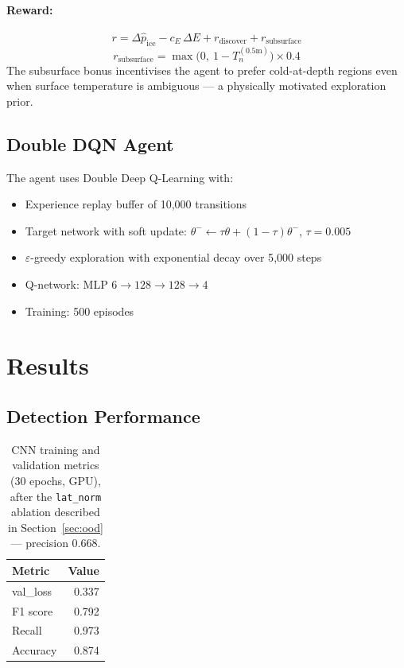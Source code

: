 \documentclass[12pt,a4paper]{article}
\begin{document}
\paragraph{Reward:}
\begin{equation}
  r = \Delta\hat{p}_\text{ice} - c_E\,\Delta E + r_\text{discover} + r_\text{subsurface}
\end{equation}
\begin{equation}
  r_\text{subsurface} = \max\!\bigl(0,\ 1 - T^{(0.5\text{m})}_n\bigr) \times 0.4
\end{equation}
The subsurface bonus incentivises the agent to prefer cold-at-depth regions even
when surface temperature is ambiguous — a physically motivated exploration prior.

\subsection{Double DQN Agent}

The agent uses Double Deep Q-Learning \citep{vanHasselt2016} with:
\begin{itemize}
  \item Experience replay buffer of 10{,}000 transitions
  \item Target network with soft update: $\theta^- \leftarrow \tau\theta + (1-\tau)\theta^-$, $\tau = 0.005$
  \item $\varepsilon$-greedy exploration with exponential decay over 5{,}000 steps
  \item Q-network: MLP $6 \to 128 \to 128 \to 4$
  \item Training: 500 episodes
\end{itemize}

\section{Results}
\label{sec:results}

\subsection{Detection Performance}

\begin{table}[H]
\centering
\caption{CNN training and validation metrics (30 epochs, GPU), after the
  \texttt{lat\_norm} ablation described in Section~\ref{sec:ood} —
  precision 0.668.}
\label{tab:results}
\begin{tabular}{lr}
\toprule
Metric & Value \\
\midrule
val\_loss & 0.337 \\
F1 score  & 0.792  \\
Recall    & 0.973  \\
Accuracy  & 0.874  \\
\bottomrule
\end{tabular}
\end{table}
\end{document}
